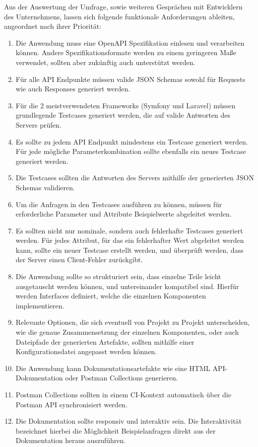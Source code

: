 Aus der Auswertung der Umfrage, sowie weiteren Gesprächen mit Entwicklern des Unternehmens, lassen sich folgende funktionale Anforderungen ableiten, angeordnet nach ihrer Priorität:

\begin{enumerate}
	\item Die Anwendung muss eine OpenAPI Spezifikation einlesen und verarbeiten können. Andere Spezifikationsformate werden zu einem geringeren Maße verwendet, sollten aber zukünftig auch unterstützt werden.
	\item Für alle API Endpunkte müssen valide JSON Schemas sowohl für Requests wie auch Responses generiert werden.
	\item Für die 2 meistverwendeten Frameworks (Symfony und Laravel) müssen grundlegende Testcases generiert werden, die auf valide Antworten des Servers prüfen. 
	\item Es sollte zu jedem API Endpunkt mindestens ein Testcase generiert werden. Für jede mögliche Parameterkombination sollte ebenfalls ein neues Testcase generiert werden.
	\item Die Testcases sollten die Antworten des Servers mithilfe der generierten JSON Schemas validieren. 
	\item Um die Anfragen in den Testcases ausführen zu können, müssen für erforderliche Parameter und Attribute Beispielwerte abgeleitet werden. 
	\item Es sollten nicht nur nominale, sondern auch fehlerhafte Testcases generiert werden. Für jedes Attribut, für das ein fehlerhafter Wert abgeleitet werden kann, sollte ein neuer Testcase erstellt werden, und überprüft werden, dass der Server einen Client-Fehler zurückgibt.
	\item Die Anwendung sollte so strukturiert sein, dass einzelne Teile leicht ausgetauscht werden können, und untereinander kompatibel sind. Hierfür werden Interfaces definiert, welche die einzelnen Komponenten implementieren.
	\item Relevante Optionen, die sich eventuell von Projekt zu Projekt unterscheiden, wie die genaue Zusammensetzung der einzelnen Komponenten, oder auch Dateipfade der generierten Artefakte, sollten mithilfe einer Konfigurationsdatei angepasst werden können.
	\item Die Anwendung kann Dokumentationsartefakte wie eine HTML API-Dokumentation oder Postman Collections generieren.
	\item Postman Collections sollten in einem CI-Kontext automatisch über die Postman API synchronisiert werden.
	\item Die Dokumentation sollte responsiv und interaktiv sein. Die Interaktivität bezeichnet hierbei die Möglichkeit Beispielanfragen direkt aus der Dokumentation heraus auszuführen.
\end{enumerate}

